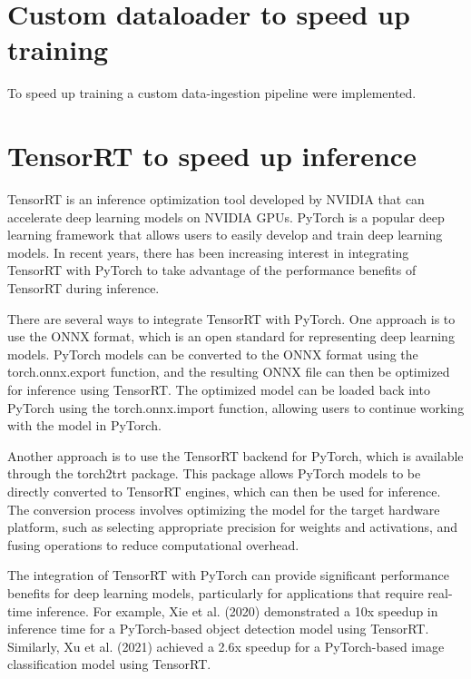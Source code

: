 \section{Custom dataloader to speed up training}
\label{sec:custom-dataloader}
To speed up training a custom data-ingestion pipeline were implemented.

\section{TensorRT to speed up inference}
\label{sec:tensorrt}
TensorRT is an inference optimization tool developed by NVIDIA that can accelerate deep learning models on NVIDIA GPUs. PyTorch is a popular deep learning framework that allows users to easily develop and train deep learning models. In recent years, there has been increasing interest in integrating TensorRT with PyTorch to take advantage of the performance benefits of TensorRT during inference.

There are several ways to integrate TensorRT with PyTorch. One approach is to use the ONNX format, which is an open standard for representing deep learning models. PyTorch models can be converted to the ONNX format using the torch.onnx.export function, and the resulting ONNX file can then be optimized for inference using TensorRT. The optimized model can be loaded back into PyTorch using the torch.onnx.import function, allowing users to continue working with the model in PyTorch.

Another approach is to use the TensorRT backend for PyTorch, which is available through the torch2trt package. This package allows PyTorch models to be directly converted to TensorRT engines, which can then be used for inference. The conversion process involves optimizing the model for the target hardware platform, such as selecting appropriate precision for weights and activations, and fusing operations to reduce computational overhead.

The integration of TensorRT with PyTorch can provide significant performance benefits for deep learning models, particularly for applications that require real-time inference. For example, Xie et al. (2020) demonstrated a 10x speedup in inference time for a PyTorch-based object detection model using TensorRT. Similarly, Xu et al. (2021) achieved a 2.6x speedup for a PyTorch-based image classification model using TensorRT.

